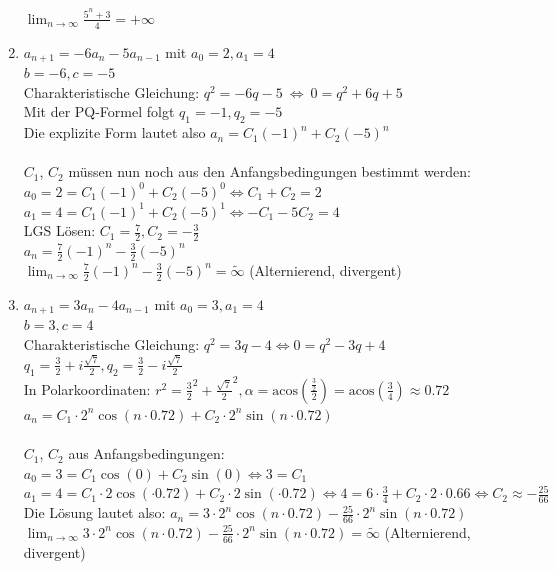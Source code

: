 \documentclass[11pt, a4paper]{article}
\newcommand\braces[1]{\left(#1\right)}
\newcommand{\acos}[1]{\mathrm{acos}\braces{#1}}
\begin{document}
\begin{enumerate}
		$\lim_{n \rightarrow \infty} \frac{5^n+3}{4} = +\infty$
	\item $a_{n+1} = -6 a_{n} - 5 a_{n-1}$ mit $a_0=2, a_1=4$ \\
		$b=-6, c=-5$ \\
		Charakteristische Gleichung: $q^2 = -6q -5 \ \Leftrightarrow \ 0 = q^2 + 6q + 5$ \\
		Mit der PQ-Formel folgt $q_1=-1, q_2=-5$ \\
		Die explizite Form lautet also $a_n = C_1 (-1)^n + C_2 (-5)^n$ \\ \\
		$C_1$, $C_2$ müssen nun noch aus den Anfangsbedingungen bestimmt werden: \\
		$a_0 = 2 = C_1 (-1)^0 + C_2 (-5)^0 \Leftrightarrow C_1 + C_2 = 2$ \\
		$a_1 = 4 = C_1 (-1)^1 + C_2 (-5)^1 \Leftrightarrow -C_1 -5C_2 = 4$ \\
		LGS Lösen: $C_1=\frac{7}{2}, C_2=-\frac{3}{2}$ \\
		$a_n = \frac{7}{2} (-1)^n - \frac{3}{2} (-5)^n$ \\
		$\lim_{n \rightarrow \infty} \frac{7}{2} (-1)^n - \frac{3}{2} (-5)^n = \tilde{\infty}$ (Alternierend, divergent)
	\item $a_{n+1} = 3 a_n - 4 a_{n-1}$ mit $a_0=3, a_1=4$ \\
		$b=3, c=4$ \\
		Charakteristische Gleichung: $q^2 = 3q - 4 \Leftrightarrow 0 = q^2 - 3q + 4$ \\
		$q_1=\frac{3}{2} + i \frac{\sqrt{7}}{2}, q_2=\frac{3}{2} - i \frac{\sqrt{7}}{2}$ \\
		In Polarkoordinaten: $r^2 = \frac{3}{2}^2 + \frac{\sqrt{7}}{2}^2, \alpha = \acos{\frac{\frac{3}{2}}{2}} = \acos{\frac{3}{4}} \approx 0.72$ \\
		$a_n = C_1 \cdot 2^n \cos(n\cdot 0.72) + C_2 \cdot 2^n \sin(n \cdot 0.72)$ \\ \\
		$C_1$, $C_2$ aus Anfangsbedingungen: \\
		$a_0 = 3 = C_1 \cos(0) + C_2 \sin(0) \Leftrightarrow 3 = C_1$ \\
		$a_1 = 4 = C_1 \cdot 2 \cos(\cdot 0.72) + C_2 \cdot 2 \sin(\cdot 0.72) \Leftrightarrow 4 = 6 \cdot \frac{3}{4} + C_2 \cdot 2 \cdot 0.66 \Leftrightarrow C_2 \approx -\frac{25}{66}$ \\
		Die Lösung lautet also: $a_n = 3 \cdot 2^n \cos(n\cdot 0.72) -\frac{25}{66} \cdot 2^n \sin(n \cdot 0.72)$ \\
		$\lim_{n \rightarrow \infty} 3 \cdot 2^n \cos(n\cdot 0.72) -\frac{25}{66} \cdot 2^n \sin(n \cdot 0.72) = \tilde{\infty}$ (Alternierend, divergent)
\end{enumerate}
\end{document}
